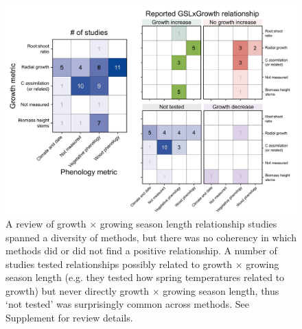 \documentclass[11pt]{article}
\begin{document}
\clearpage
\begin{figure}[h!]
\label{fig:heatmaps}
\includegraphics[width=1\textwidth]{..//figures/_figuresFromRuben/heatmap.png} %
\caption{A review of growth $\times$ growing season length relationship studies spanned a diversity of methods, but there was no coherency in which methods did or did not find a positive relationship. A number of studies tested relationships possibly related to growth $\times$ growing season length (e.g. they tested how spring temperatures related to growth) but never directly growth $\times$ growing season length, thus `not tested' was surprisingly common across methods. See Supplement for review details.}
\end{figure}

\end{document}

